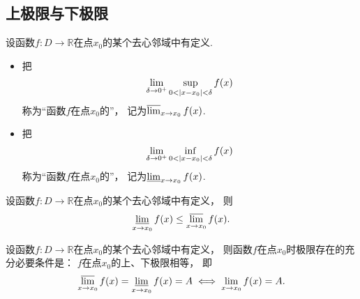 \subsection{上极限与下极限}
\begin{definition}
设函数\(f\colon D\to\mathbb{R}\)在点\(x_0\)的某个去心邻域中有定义.
\begin{itemize}
	\item 	把\[
		\lim_{\delta\to0^+} \sup_{0<\abs{x-x_0}<\delta} f(x)
	\]称为“函数\(f\)在点\(x_0\)的”，
	记为\(\varlimsup_{x \to x_0} f(x)\).

	\item 把\[
		\lim_{\delta\to0^+} \inf_{0<\abs{x-x_0}<\delta} f(x)
	\]称为“函数\(f\)在点\(x_0\)的”，
	记为\(\varliminf_{x \to x_0} f(x)\).
\end{itemize}
\end{definition}

\begin{property}
设函数\(f\colon D\to\mathbb{R}\)在点\(x_0\)的某个去心邻域中有定义，
则\[
	\varliminf_{x \to x_0} f(x) \leq \varlimsup_{x \to x_0} f(x).
\]
\end{property}

\begin{theorem}
设函数\(f\colon D\to\mathbb{R}\)在点\(x_0\)的某个去心邻域中有定义，
则函数\(f\)在点\(x_0\)时极限存在的充分必要条件是：
\(f\)在点\(x_0\)的上、下极限相等，
即\[
	\varlimsup_{x \to x_0} f(x)
	= \varliminf_{x \to x_0} f(x)
	= A
	\iff
	\lim_{x \to x_0} f(x) = A.
\]
\end{theorem}
